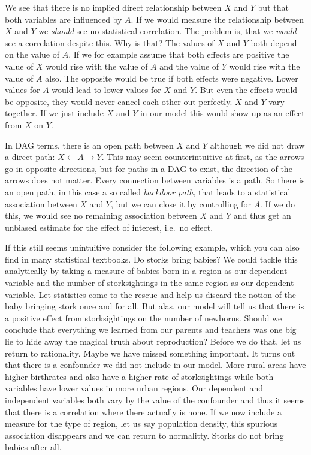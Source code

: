 \documentclass[
]{book}
\begin{document}
We see that there is no implied direct relationship between \(X\) and \(Y\) but that
both variables are influenced by \(A\). If we would measure the relationship
between \(X\) and \(Y\) we \emph{should} see no statistical correlation. The problem is,
that we \emph{would} see a correlation despite this. Why is that?
The values of \(X\) and \(Y\) both depend on the value of \(A\). If we for example
assume that both effects are positive the value of \(X\) would rise with the value
of \(A\) and the value of \(Y\) would rise with the value of \(A\) also.
The opposite would be true if both effects were negative. Lower values for \(A\)
would lead to lower values for \(X\) and \(Y\).
But even the effects would be opposite, they would never cancel each other out
perfectly. \(X\) and \(Y\) vary together.
If we just include \(X\) and \(Y\) in our model this would show up as an
effect from \(X\) on \(Y\).

In DAG terms, there is an open path between \(X\) and \(Y\) although we did not
draw a direct path: \(X \leftarrow A \rightarrow Y\). This may seem
counterintuitive at first, as the arrows go in opposite directions, but for
paths in a DAG to exist, the direction of the arrows does not matter. Every
connection between variables is a path. So there is an open path, in this case
a so called \emph{backdoor path}, that leads to a statistical association between
\(X\) and \(Y\), but we can close it by controlling for \(A\). If we do this, we would
see no remaining association between \(X\) and \(Y\) and thus get an unbiased
estimate for the effect of interest, i.e.~no effect.

If this still seems unintuitive consider the following example, which you can
also find in many statistical textbooks. Do storks bring babies? We could tackle
this analytically by taking a measure of babies born in a region as our dependent
variable and the number of storksightings in the same region as our dependent
variable. Let statistics come to the rescue and help us discard the notion of
the baby bringing stork once and for all. But alas, our model will tell us that
there is a positive effect from storksightings on the number of newborns. Should
we conclude that everything we learned from our parents and teachers was one big
lie to hide away the magical truth about reproduction? Before we do that, let us
return to rationality. Maybe we have missed something important. It turns out
that there is a confounder we did not include in our model. More rural areas
have higher birthrates and also have a higher rate of storksightings while both
variables have lower values in more urban regions. Our dependent and independent
variables both vary by the value of the confounder and thus it seems that there
is a correlation where there actually is none. If we now include a measure for
the type of region, let us say population density, this spurious association
disappears and we can return to normalitty. Storks do not bring babies after all.
\end{document}

